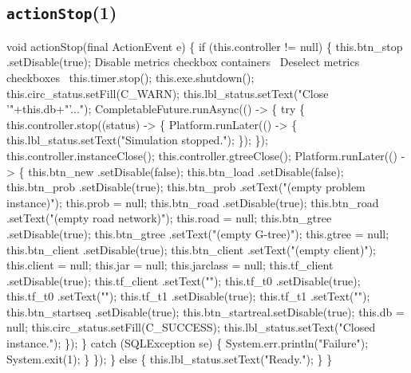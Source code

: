\subsection{\texttt{actionStop}(1)}
\nwenddocs{}\endmoddef{}
void actionStop(final ActionEvent e) \{
  if (this.controller != null) \{
    this.btn_stop     .setDisable(true);
    \LA{}Disable metrics checkbox containers~{\nwtagstyle{}}\RA{}
    \LA{}Deselect metrics checkboxes~{\nwtagstyle{}}\RA{}
    this.timer.stop();
    this.exe.shutdown();
    this.circ_status.setFill(C_WARN);
    this.lbl_status.setText("Close '"+this.db+"'...");
    CompletableFuture.runAsync(() -> \{
      try \{
        this.controller.stop((status) -> \{
          Platform.runLater(() -> \{
            this.lbl_status.setText("Simulation stopped.");
          \});
        \});
        this.controller.instanceClose();
        this.controller.gtreeClose();
        Platform.runLater(() -> \{
          this.btn_new      .setDisable(false);
          this.btn_load     .setDisable(false);
          this.btn_prob     .setDisable(true);
          this.btn_prob     .setText("(empty problem instance)");
          this.prob = null;
          this.btn_road     .setDisable(true);
          this.btn_road     .setText("(empty road network)");
          this.road = null;
          this.btn_gtree    .setDisable(true);
          this.btn_gtree    .setText("(empty G-tree)");
          this.gtree = null;
          this.btn_client   .setDisable(true);
          this.btn_client   .setText("(empty client)");
          this.client = null;
          this.jar = null;
          this.jarclass = null;
          this.tf_client     .setDisable(true);
          this.tf_client     .setText("");
          this.tf_t0        .setDisable(true);
          this.tf_t0        .setText("");
          this.tf_t1        .setDisable(true);
          this.tf_t1        .setText("");
          this.btn_startseq .setDisable(true);
          this.btn_startreal.setDisable(true);
          this.db = null;
          this.circ_status.setFill(C_SUCCESS);
          this.lbl_status.setText("Closed instance.");
        \});
      \} catch (SQLException se) \{
        System.err.println("Failure");
        System.exit(1);
      \}
    \});
  \} else \{
    this.lbl_status.setText("Ready.");
  \}
\}
\eatline
{}\nwendcode{}\nwdocspar
